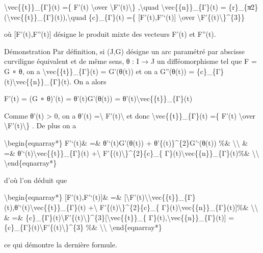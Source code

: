 \documentclass[]{article}
\begin{document}
\textbackslash{}vec\{\{t\}\}\_\{Γ\}(t) =\{ F'(t) \textbackslash{}over
\textbackslash{}\textbar{}F'(t)\textbackslash{}\textbar{}\}
,\textbackslash{}quad \textbackslash{}vec\{\{n\}\}\_\{Γ\}(t) =
\{r\}\_\{π∕2\}(\textbackslash{}vec\{\{t\}\}\_\{Γ\}(t)),\textbackslash{}quad
\{c\}\_\{Γ\}(t) =\{ {[}F'(t),F'`(t){]} \textbackslash{}over
\textbackslash{}\textbar{}F'\{(t)\textbackslash{}\textbar{}\}\^{}\{3\}\}

où {[}F'(t),F''(t){]} désigne le produit mixte des vecteurs F'(t) et
F''(t).

Démonstration Par définition, si (J,G) désigne un arc paramétré par
abscisse curviligne équivalent et de même sens, θ : I → J un
difféomorphisme tel que F = G ∘ θ, on a
\textbackslash{}vec\{\{t\}\}\_\{Γ\}(t) = G'(θ(t)) et on a G''(θ(t)) =
\{c\}\_\{Γ\}(t)\textbackslash{}vec\{\{n\}\}\_\{Γ\}(t). On a alors

F'(t) = (G ∘ θ)'(t) = θ'(t)G'(θ(t)) =
θ'(t)\textbackslash{}vec\{\{t\}\}\_\{Γ\}(t)

Comme θ'(t) \textgreater{} 0, on a θ'(t) =\textbackslash{}\textbar{}
F'(t)\textbackslash{}\textbar{} et donc
\textbackslash{}vec\{\{t\}\}\_\{Γ\}(t) =\{ F'(t) \textbackslash{}over
\textbackslash{}\textbar{}F'(t)\textbackslash{}\textbar{}\} . De plus on
a

\textbackslash{}begin\{eqnarray*\} F'`(t)\& =\& θ'`(t)G'(θ(t)) +
θ'\{(t)\}\^{}\{2\}G'`(θ(t)) \%\& \textbackslash{}\textbackslash{} \& =\&
θ'`(t)\textbackslash{}vec\{\{t\}\}\_\{Γ\}(t) +\textbackslash{}\textbar{}
F'\{(t)\textbackslash{}\textbar{}\}\^{}\{2\}\{c\}\_\{
Γ\}(t)\textbackslash{}vec\{\{n\}\}\_\{Γ\}(t)\%\&
\textbackslash{}\textbackslash{} \textbackslash{}end\{eqnarray*\}

d'où l'on déduit que

\textbackslash{}begin\{eqnarray*\} {[}F'(t),F'`(t){]}\& =\&
{[}\textbackslash{}\textbar{}F'(t)\textbackslash{}\textbar{}\textbackslash{}vec\{\{t\}\}\_\{Γ\}(t),θ'`(t)\textbackslash{}vec\{\{t\}\}\_\{Γ\}(t)
+\textbackslash{}\textbar{}
F'\{(t)\textbackslash{}\textbar{}\}\^{}\{2\}\{c\}\_\{
Γ\}(t)\textbackslash{}vec\{\{n\}\}\_\{Γ\}(t){]}\%\&
\textbackslash{}\textbackslash{} \& =\&
\{c\}\_\{Γ\}(t)\textbackslash{}\textbar{}F'\{(t)\textbackslash{}\textbar{}\}\^{}\{3\}{[}\textbackslash{}vec\{\{t\}\}\_\{
Γ\}(t),\textbackslash{}vec\{\{n\}\}\_\{Γ\}(t){]} =
\{c\}\_\{Γ\}(t)\textbackslash{}\textbar{}F'\{(t)\textbackslash{}\textbar{}\}\^{}\{3\}
\%\& \textbackslash{}\textbackslash{} \textbackslash{}end\{eqnarray*\}

ce qui démontre la dernière formule.
\end{document}
